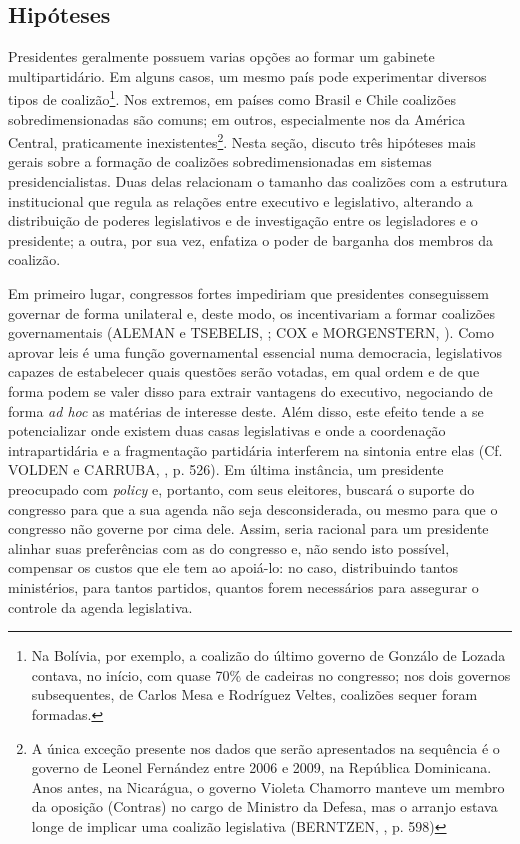 \subsection{Hipóteses}
\label{sec:hipoteses}

Presidentes geralmente possuem varias opções ao formar um gabinete multipartidário. Em alguns casos, um mesmo país pode experimentar diversos tipos de coalizão\footnote{Na Bolívia, por exemplo, a coalizão do último governo de Gonzálo de Lozada contava, no início, com quase 70\% de cadeiras no congresso; nos dois governos subsequentes, de Carlos Mesa e Rodríguez Veltes, coalizões sequer foram formadas.}. Nos extremos, em países como Brasil e Chile coalizões sobredimensionadas são comuns; em outros, especialmente nos da América Central, praticamente inexistentes\footnote{A única exceção presente nos dados que serão apresentados na sequência é o governo de Leonel Fernández entre 2006 e 2009, na República Dominicana. Anos antes, na Nicarágua, o governo Violeta Chamorro manteve um membro da oposição (Contras) no cargo de Ministro da Defesa, mas o arranjo estava longe de implicar uma coalizão legislativa (BERNTZEN, \citeyear{berntzen1993}, p. 598)}. Nesta seção, discuto três hipóteses mais gerais sobre a formação de coalizões sobredimensionadas em sistemas presidencialistas. Duas delas relacionam o tamanho das coalizões com a estrutura institucional que regula as relações entre executivo e legislativo, alterando a distribuição de poderes legislativos e de investigação entre os legisladores e o presidente; a outra, por sua vez, enfatiza o poder de barganha dos membros da coalizão.

Em primeiro lugar, congressos fortes impediriam que presidentes conseguissem governar de forma unilateral e, deste modo, os incentivariam a formar coalizões governamentais (ALEMAN e TSEBELIS, \citeyear{aleman2011}; COX e MORGENSTERN, \citeyear{cox2001}). Como aprovar leis é uma função governamental essencial numa democracia, legislativos capazes de estabelecer quais questões serão votadas, em qual ordem e de que forma podem se valer disso para extrair vantagens do executivo, negociando de forma \textit{ad hoc} as matérias de interesse deste. Além disso, este efeito tende a se potencializar onde existem duas casas legislativas e onde a coordenação intrapartidária e a fragmentação partidária interferem na sintonia entre elas (Cf. VOLDEN e CARRUBA, \citeyear{volden2004}, p. 526). Em última instância, um presidente preocupado com \textit{policy} e, portanto, com seus eleitores, buscará o suporte do congresso para que a sua agenda não seja desconsiderada, ou mesmo para que o congresso não governe por cima dele. Assim, seria racional para um presidente alinhar suas preferências com as do congresso e, não sendo isto possível, compensar os custos que ele tem ao apoiá-lo: no caso, distribuindo tantos ministérios, para tantos partidos, quantos forem necessários para assegurar o controle da agenda legislativa. 

